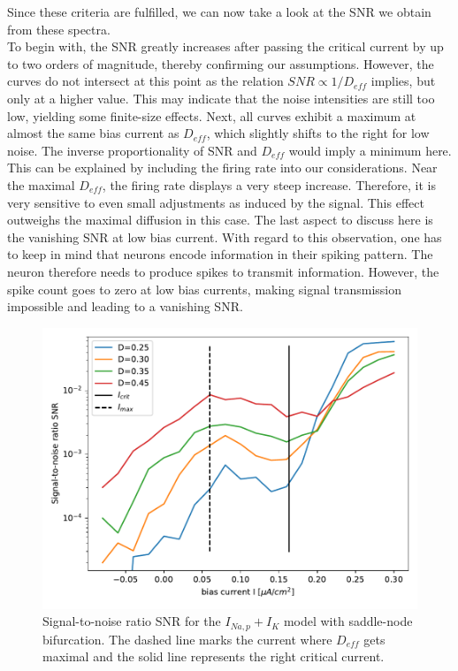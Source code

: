 \documentclass[12pt,a4paper]{article}
\begin{document}
Since these criteria are fulfilled, we can now take a look at the SNR we obtain from these spectra.\\
To begin with, the SNR greatly increases after passing the critical current by up to two orders of magnitude, thereby confirming our assumptions. However, the curves do not intersect at this point as the relation $SNR\propto1/D_{eff}$ implies, but only at a higher value. This may indicate that the noise intensities are still too low, yielding some finite-size effects. Next, all curves exhibit a maximum at almost the same bias current as $D_{eff}$, which slightly shifts to the right for low noise. The inverse proportionality of SNR and $D_{eff}$ would imply a minimum here. This can be explained by including the firing rate into our considerations. Near the maximal $D_{eff}$, the firing rate displays a very steep increase. Therefore, it is very sensitive to even small adjustments as induced by the signal. This effect outweighs the maximal diffusion in this case. The last aspect to discuss here is the vanishing SNR at low bias current. With regard to this observation, one has to keep in mind that neurons encode information in their spiking pattern. The neuron therefore needs to produce spikes to transmit information. However, the spike count goes to zero at low bias currents, making signal transmission impossible and leading to a vanishing SNR.

\begin{figure}[H]
	\centering
	\includegraphics[scale=0.95]{snrealonly2crit5max.pdf}\caption{Signal-to-noise ratio SNR for the $I_{Na,p}+I_K$ model with saddle-node bifurcation. The dashed line marks the current where $D_{eff}$ gets maximal and the solid line represents the right critical current.}
	\label{specneur}
\end{figure}
\end{document}
